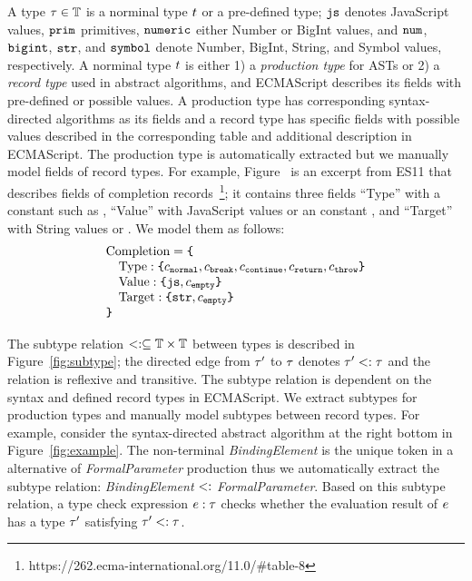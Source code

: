 A type $\tau \in \mathbb{T}$ is a norminal type $t$ or a pre-defined type;
$\texttt{js}$ denotes JavaScript values, $\texttt{prim}$ primitives, $\texttt{numeric}$ either Number
or BigInt values, and $\texttt{num}$, $\texttt{bigint}$, $\texttt{str}$, and $\texttt{symbol}$ denote Number,
BigInt, String, and Symbol values, respectively.  A norminal type $t$ is
either 1) a \textit{production type} for ASTs or 2) a \textit{record type} used
in abstract algorithms, and ECMAScript describes its fields with pre-defined or
possible values.  A production type has corresponding syntax-directed algorithms
as its fields and a record type has specific fields with possible values
described in the corresponding table and additional description in ECMAScript.
The production type is automatically extracted but we manually model fields of
record types.  For example, Figure~\label{fig:record-fields-table} is an excerpt
from ES11 that describes fields of completion
records~\footnote{https://262.ecma-international.org/11.0/\#table-8}; it
contains three fields ``Type'' with a constant such as , ``Value''
with JavaScript values or an constant , and ``Target'' with String
values or .  We model them as follows:
\small
\[
  \begin{array}{l}
    \text{Completion} = \texttt{\{}\\
    \quad \text{Type}: \texttt{\{} c_{\texttt{normal}}, c_{\texttt{break}}, c_{\texttt{continue}},
    c_{\texttt{return}}, c_{\texttt{throw}} \texttt{\}}\\
    \quad \text{Value}: \texttt{\{} \texttt{js}, c_{\texttt{empty}} \texttt{\}}\\
    \quad \text{Target}: \texttt{\{} \texttt{str}, c_{\texttt{empty}} \texttt{\}}\\
    \texttt{\}}\\
  \end{array}
\]

The subtype relation $<: \subseteq \mathbb{T} \times \mathbb{T}$ between types is
described in Figure~\ref{fig:subtype}; the directed edge from $\tau'$ to $\tau$
denotes $\tau' <: \tau$ and the relation is reflexive and transitive.  The
subtype relation is dependent on the syntax and defined record types in
ECMAScript.  We extract subtypes for production types and manually model
subtypes between record types.  For example, consider the syntax-directed
abstract algorithm at the right bottom in Figure~\ref{fig:example}.  The
non-terminal \textit{BindingElement} is the unique token in a alternative of
\textit{FormalParameter} production thus we automatically extract the subtype
relation: \textit{BindingElement} $<:$ \textit{FormalParameter}.  Based on
this subtype relation, a type check expression $e: \tau$ checks whether the
evaluation result of $e$ has a type $\tau'$ satisfying $\tau' <: \tau$.


